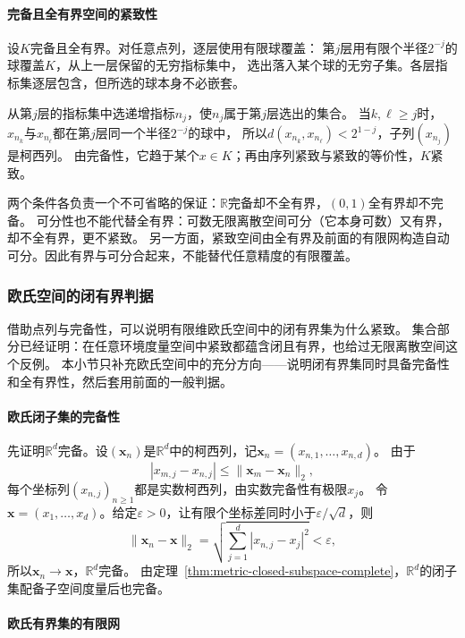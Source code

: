 \paragraph{完备且全有界空间的紧致性}

设$K$完备且全有界。对任意点列，逐层使用有限球覆盖：
第$j$层用有限个半径$2^{-j}$的球覆盖$K$，从上一层保留的无穷指标集中，
选出落入某个球的无穷子集。各层指标集逐层包含，但所选的球本身不必嵌套。

从第$j$层的指标集中选递增指标$n_j$，使$n_j$属于第$j$层选出的集合。
当$k,\ell\geq j$时，$x_{n_k}$与$x_{n_\ell}$都在第$j$层同一个半径$2^{-j}$的球中，
所以$d(x_{n_k},x_{n_\ell})<2^{1-j}$，子列$(x_{n_j})$是柯西列。
由完备性，它趋于某个$x\in K$；再由序列紧致与紧致的等价性，$K$紧致。

两个条件各负责一个不可省略的保证：$\mathbb R$完备却不全有界，$(0,1)$全有界却不完备。
可分性也不能代替全有界：可数无限离散空间可分（它本身可数）又有界，却不全有界，更不紧致。
另一方面，紧致空间由全有界及前面的有限网构造自动可分。因此有界与可分合起来，不能替代任意精度的有限覆盖。

\subsubsection{欧氏空间的闭有界判据}
\label{sec:metric-closed-bounded-limits}

借助点列与完备性，可以说明有限维欧氏空间中的闭有界集为什么紧致。
集合部分已经证明：在任意环境度量空间中紧致都蕴含闭且有界，也给过无限离散空间这个反例。
本小节只补充欧氏空间中的充分方向——说明闭有界集同时具备完备性和全有界性，然后套用前面的一般判据。

\paragraph{欧氏闭子集的完备性}

先证明$\mathbb R^d$完备。设$(\bm{x}_n)$是$\mathbb R^d$中的柯西列，记$\bm{x}_n=(x_{n,1},\ldots,x_{n,d})$。
由于
\[
  |x_{m,j}-x_{n,j}|\leq\lVert\bm{x}_m-\bm{x}_n\rVert_2,
\]
每个坐标列$(x_{n,j})_{n\geq1}$都是实数柯西列，由实数完备性有极限$x_j$。
令$\bm{x}=(x_1,\ldots,x_d)$。给定$\varepsilon>0$，让有限个坐标差同时小于$\varepsilon/\sqrt d$，则
\[
  \lVert\bm{x}_n-\bm{x}\rVert_2
  =\sqrt{\sum_{j=1}^{d}|x_{n,j}-x_j|^2}<\varepsilon,
\]
所以$\bm{x}_n\to\bm{x}$，$\mathbb R^d$完备。
由定理~\ref{thm:metric-closed-subspace-complete}，$\mathbb R^d$的闭子集配备子空间度量后也完备。

\paragraph{欧氏有界集的有限网}


